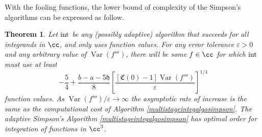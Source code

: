 \documentclass{iitthesis}
\DeclareMathOperator{\Var}{Var}
\newtheorem{theorem}{Theorem}
\theoremstyle{definition}
\theoremstyle{remark}
\begin{document}
With the fooling functions, the lower bound of complexity of the Simpson's algorithms can be expressed as follow.
\begin{theorem}\label{compsim}
    Let $\textup{int}$ be any (possibly adaptive) algorithm that succeeds for all integrands in $\cc$, and only uses function values. For any error tolerance $\varepsilon > 0$ and any arbitrary value of $\Var(f''')$, there will be some $f\in \cc$ for which $\textup{int}$ must use at least
    \begin{equation}\label{complowbdsim}
        -\frac{5}{4}+\frac{b-a-5\mathfrak{h}}{8}\left[\frac{[\mathfrak{C}(0)-1]\Var( f''')}{\varepsilon}\right]^{1/4}
    \end{equation}
    function values. As $\Var(f''')/\varepsilon \rightarrow \infty$ the asymptotic rate of increase is the same as the computational cost of Algorithm \ref{multistageintegalgosimpson}. The adaptive Simpson's Algorithm \ref{multistageintegalgosimpson} has optimal order for integration of functions in $\cc^3$.
\end{theorem}
\end{document}
